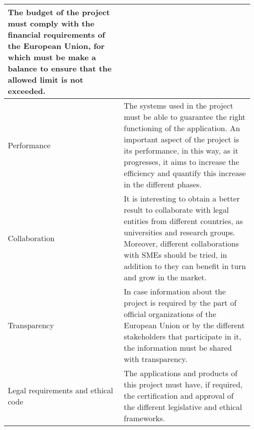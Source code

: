 \begin{center}
\begin{tabular}{|p{2cm}|p{10cm}|}
		The budget of the project must comply with the financial requirements of the European Union, for which must be make a balance to ensure that the allowed limit is not exceeded.
		\\ 
		\hline 
		Performance & The systems used in the project must be able to guarantee the right functioning of the application. An important aspect of the project is its performance, in this way, as it progresses, it aims to increase the efficiency and quantify this increase in the different phases. 
		\\ 
		\hline 
		Collaboration & It is interesting to obtain a better result to collaborate with legal entities from different countries, as universities and research groups. Moreover, different collaborations with SMEs should be tried, in addition to they can benefit in turn and grow in the market. 
		\\ 
		\hline
		Transparency & In case information about the project is required by the part of official organizations of the European Union or by the different stakeholders that participate in it, the information must be shared with transparency. 
		\\ 
		\hline
		Legal requirements and ethical code & The applications and products of this project must have, if required, the certification and approval of the different legislative and ethical frameworks. \\ 
		\hline
		
	\end{tabular} 
\end{center}